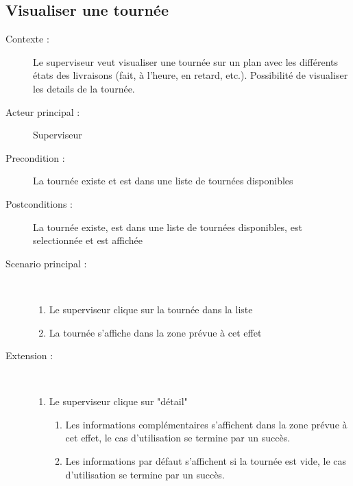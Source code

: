 \subsection{Visualiser une tourn\'ee}
\begin{description}
    \item[Contexte :] Le superviseur veut visualiser une tourn\'ee sur un plan avec les diff\'erents \'etats des livraisons (fait, \`a l'heure, en retard, etc.). Possibilit\'e de visualiser les details de la tourn\'ee.
    \item[Acteur principal :] Superviseur
    \item[Precondition :] La tourn\'ee existe et est dans une liste de tourn\'ees disponibles
    \item[Postconditions :] La tourn\'ee existe, est dans une liste de tourn\'ees disponibles, est selectionn\'ee et est affich\'ee
    \item[Scenario principal :] ~
    \begin{enumerate}
        \item Le superviseur clique sur la tourn\'ee dans la liste
        \item La tourn\'ee s'affiche dans la zone pr\'evue \`a cet effet
    \end{enumerate}
    \item[Extension :] ~
    \begin{enumerate}
        \item Le superviseur clique sur "d\'etail"
        \begin{enumerate}
            \item Les informations compl\'ementaires s'affichent dans la zone pr\'evue \`a cet effet, le cas d'utilisation se termine par un succ\`es.
            \item Les informations par d\'efaut s'affichent si la tourn\'ee est vide, le cas d'utilisation se termine par un succ\`es.
        \end{enumerate}
    \end{enumerate}
\end{description}

